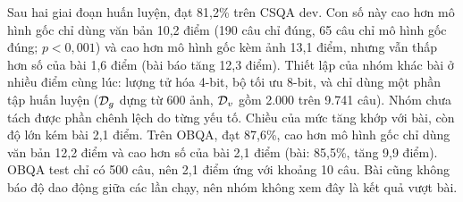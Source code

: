 \begin{table}[t]
\centering
\caption{Tái lập kết quả QA thường thức (độ chính xác, \%)}
\label{tab:gv-repro-main}
\small
{}
\end{table}

Sau hai giai đoạn huấn luyện, \GV{} đạt 81,2\% trên CSQA dev. Con số này cao hơn mô hình gốc chỉ dùng văn bản 10,2 điểm (190 câu chỉ \GV{} đúng, 65 câu chỉ mô hình gốc đúng; $p<0{,}001$) và cao hơn mô hình gốc kèm ảnh 13,1 điểm, nhưng vẫn thấp hơn số của bài 1,6 điểm (bài báo tăng 12,3 điểm). Thiết lập của nhóm khác bài ở nhiều điểm cùng lúc: lượng tử hóa 4-bit, bộ tối ưu 8-bit, và chỉ dùng một phần tập huấn luyện ($\mathcal{D}_g$ dựng từ 600 ảnh, $\mathcal{D}_v$ gồm 2.000 trên 9.741 câu). Nhóm chưa tách được phần chênh lệch do từng yếu tố. Chiều của mức tăng khớp với bài, còn độ lớn kém bài 2,1 điểm. Trên OBQA, \GV{} đạt 87,6\%, cao hơn mô hình gốc chỉ dùng văn bản 12,2 điểm và cao hơn số của bài 2,1 điểm (bài: 85,5\%, tăng 9,9 điểm). OBQA test chỉ có 500 câu, nên 2,1 điểm ứng với khoảng 10 câu. Bài cũng không báo độ dao động giữa các lần chạy, nên nhóm không xem đây là kết quả vượt bài. 


